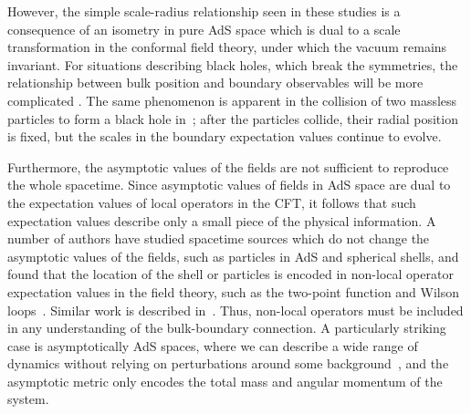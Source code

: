 \documentclass[a4paper,12pt]{article}
\begin{document}
However, the simple scale-radius relationship seen in these studies is
a consequence of an isometry in pure AdS space which is dual to a
scale transformation in the conformal field theory, under which the
vacuum remains invariant.  For situations describing black holes,
which break the symmetries, the relationship between bulk position and
boundary observables will be more complicated \cite{dkk,cons:glue}.
The same phenomenon is apparent in the collision of two massless
particles to form a black hole in~\cite{joeetal}; after the particles
collide, their radial position is fixed, but the scales in the
boundary expectation values continue to evolve.

Furthermore, the asymptotic values of the fields are not sufficient to
reproduce the whole spacetime.  Since asymptotic values of fields in
AdS space are dual to the expectation values of local operators in the
CFT, it follows that such expectation values describe only a small
piece of the physical information.  A number of authors have studied
spacetime sources which do not change the asymptotic values of the
fields, such as particles in AdS\coordHE{} and spherical shells, and found
that the location of the shell or particles is encoded in non-local
operator expectation values in the field theory, such as the two-point
function and Wilson
loops~\cite{holopart,sfsg:shell,dan:shell,chep:shell}. Similar work is
described in~\cite{suss:loop}. Thus, non-local operators must be
included in any understanding of the bulk-boundary connection. A
particularly striking case is asymptotically AdS\coordHE{} spaces, where we
can describe a wide range of dynamics without relying on perturbations
around some background~\cite{matschull,holst-matschull}, and the
asymptotic metric only encodes the total mass and angular momentum of
the system.
\end{document}
